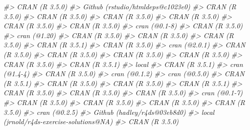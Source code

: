 \documentclass[]{book}
\newenvironment{Shaded}{\begin{snugshade}}{\end{snugshade}}
\newcommand{\CommentTok}[1]{\textcolor[rgb]{0.56,0.35,0.01}{\textit{#1}}}
\theoremstyle{plain}
\theoremstyle{remark}
\begin{document}
\begin{Shaded}
\begin{Highlighting}[]
\CommentTok{#>  CRAN (R 3.5.0)                           }
\CommentTok{#>  Github (rstudio/htmldeps@c1023e0)        }
\CommentTok{#>  CRAN (R 3.5.0)                           }
\CommentTok{#>  CRAN (R 3.5.0)                           }
\CommentTok{#>  CRAN (R 3.5.0)                           }
\CommentTok{#>  CRAN (R 3.5.0)                           }
\CommentTok{#>  CRAN (R 3.5.0)                           }
\CommentTok{#>  CRAN (R 3.5.0)                           }
\CommentTok{#>  cran (@0.1-8)                            }
\CommentTok{#>  CRAN (R 3.5.0)                           }
\CommentTok{#>  cran (@1.20)                             }
\CommentTok{#>  CRAN (R 3.5.0)                           }
\CommentTok{#>  CRAN (R 3.5.0)                           }
\CommentTok{#>  CRAN (R 3.5.0)                           }
\CommentTok{#>  CRAN (R 3.5.1)                           }
\CommentTok{#>  CRAN (R 3.5.0)                           }
\CommentTok{#>  cran (@2.0.1)                            }
\CommentTok{#>  CRAN (R 3.5.0)                           }
\CommentTok{#>  CRAN (R 3.5.0)                           }
\CommentTok{#>  CRAN (R 3.5.0)                           }
\CommentTok{#>  CRAN (R 3.5.0)                           }
\CommentTok{#>  CRAN (R 3.5.0)                           }
\CommentTok{#>  CRAN (R 3.5.1)                           }
\CommentTok{#>  local                                    }
\CommentTok{#>  CRAN (R 3.5.1)                           }
\CommentTok{#>  cran (@1.4-4)                            }
\CommentTok{#>  CRAN (R 3.5.0)                           }
\CommentTok{#>  cran (@0.1.2)                            }
\CommentTok{#>  cran (@0.5.0)                            }
\CommentTok{#>  CRAN (R 3.5.1)                           }
\CommentTok{#>  CRAN (R 3.5.0)                           }
\CommentTok{#>  CRAN (R 3.5.0)                           }
\CommentTok{#>  CRAN (R 3.5.1)                           }
\CommentTok{#>  CRAN (R 3.5.0)                           }
\CommentTok{#>  CRAN (R 3.5.0)                           }
\CommentTok{#>  CRAN (R 3.5.0)                           }
\CommentTok{#>  cran (@0.1-7)                            }
\CommentTok{#>  CRAN (R 3.5.0)                           }
\CommentTok{#>  CRAN (R 3.5.0)                           }
\CommentTok{#>  CRAN (R 3.5.0)                           }
\CommentTok{#>  CRAN (R 3.5.0)                           }
\CommentTok{#>  cran (@0.2.5)                            }
\CommentTok{#>  Github (hadley/r4ds@03eb8d0)             }
\CommentTok{#>  local (jrnold/r4ds-exercise-solutions@NA)}
\CommentTok{#>  CRAN (R 3.5.0)                           }

\end{Highlighting}
\end{Shaded}
\end{document}
